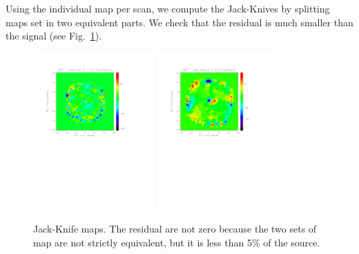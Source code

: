 \documentclass[a4paper]{article}
\begin{document}
Using the individual map per scan, we compute the Jack-Knives by splitting maps set in two equivalent parts. We check that  the residual is much smaller than the signal (see Fig.~\ref{fig:M87_JK}).
\begin{figure}
\centering
\includegraphics[height=6cm, trim=2cm 13cm 4cm 2cm, clip=true]{Figure/M87_jack-knife_1mm}
\includegraphics[height=6cm, trim=2cm 13cm 4cm 2cm, clip=true]{Figure/M87_jack-knife_2mm}
\caption{Jack-Knife maps. The residual are not zero because the two sets of map are not strictly equivalent, but it is less than 5\% of the source.}
\label{fig:M87_JK}
\end{figure}
\end{document}
